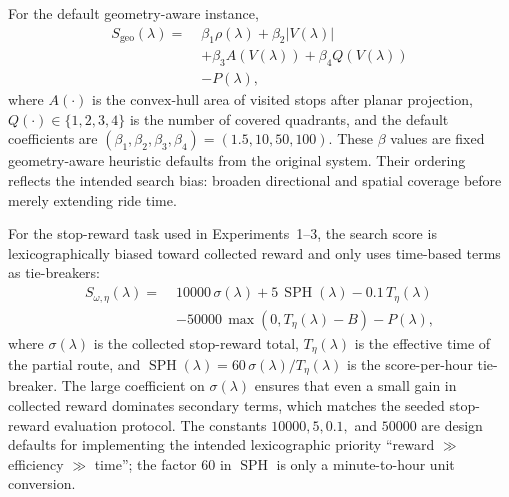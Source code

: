 For the default geometry-aware instance,
\begin{equation}
    \label{eq:search_score_geometry}
    \begin{aligned}
        S_{\mathrm{geo}}(\lambda)
        =\; & \beta_1 \rho(\lambda)
        + \beta_2 |V(\lambda)|        \\
            & + \beta_3 A(V(\lambda))
        + \beta_4 Q(V(\lambda))       \\
            & - P(\lambda),
    \end{aligned}
\end{equation}
where \(A(\cdot)\) is the convex-hull area of visited stops after planar
projection, \(Q(\cdot)\in\{1,2,3,4\}\) is the number of covered quadrants, and
the default coefficients are
\((\beta_1,\beta_2,\beta_3,\beta_4)=(1.5,10,50,100)\).
These \(\beta\) values are fixed geometry-aware heuristic defaults from the
original system. Their ordering reflects the intended search bias: broaden
directional and spatial coverage before merely extending ride time.

For the stop-reward task used in Experiments~1--3, the search score is
lexicographically biased toward collected reward and only uses time-based terms
as tie-breakers:
\begin{equation}
    \label{eq:search_score_stop_reward}
    \begin{aligned}
        S_{\omega,\eta}(\lambda)
        =\; & 10000 \, \sigma(\lambda)
        + 5 \, \operatorname{SPH}(\lambda)
        - 0.1 \, T_{\eta}(\lambda)                                 \\
            & - 50000 \, \max\!\left(0, T_{\eta}(\lambda)-B\right)
        - P(\lambda),
    \end{aligned}
\end{equation}
where \(\sigma(\lambda)\) is the collected stop-reward total,
\(T_{\eta}(\lambda)\) is the effective time of the partial route, and
\(\operatorname{SPH}(\lambda)=60\,\sigma(\lambda)/T_{\eta}(\lambda)\) is the
score-per-hour tie-breaker. The large coefficient on \(\sigma(\lambda)\)
ensures that even a small gain in collected reward dominates secondary terms,
which matches the seeded stop-reward evaluation protocol. The constants
\(10000, 5, 0.1,\) and \(50000\) are design defaults for implementing the
intended lexicographic priority ``reward \(\gg\) efficiency \(\gg\) time'';
the factor 60 in \(\operatorname{SPH}\) is only a minute-to-hour unit
conversion.

